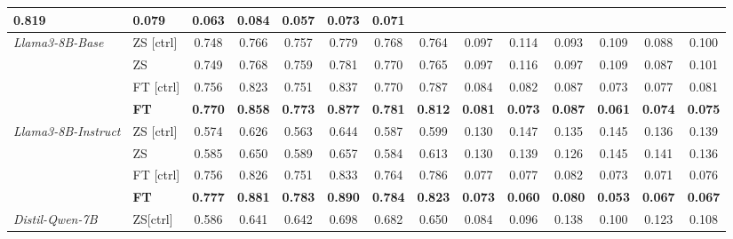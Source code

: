 \begin{table*}[!]
{\begin{tabular}{l|l|ccccc|c|ccccc|c}
\cellcolor{customgray}\textbf{0.819} & 
\cellcolor{customgray}\textbf{0.079} & 
\cellcolor{customgray}\textbf{0.063} & 
\cellcolor{customgray}\textbf{0.084} & 
\cellcolor{customgray}\textbf{0.057} & 
\cellcolor{customgray}\textbf{0.073} & 
\cellcolor{customgray}\textbf{0.071} \\ \midrule
\multirow{4}{*}{\textit{Llama3-8B-Base}} & ZS [ctrl] & 0.748 & 0.766 & 0.757 & 0.779 & 0.768 & 0.764 & 0.097 & 0.114 & 0.093 & 0.109 & 0.088  & 0.100 \\
& ZS & 0.749 & 0.768 & 0.759 & 0.781 & 0.770 & 0.765 & 0.097 & 0.116 & 0.097 & 0.109 & 0.087  & 0.101 \\
& FT [ctrl] & 0.756 & 0.823 & 0.751 & 0.837 & 0.770 & 0.787 & 0.084 & 0.082 & 0.087 & 0.073 & 0.077 & 0.081 \\
& \cellcolor{customgray}\textbf{FT} & 
\cellcolor{customgray}\textbf{0.770} & 
\cellcolor{customgray}\textbf{0.858} & 
\cellcolor{customgray}\textbf{0.773} & 
\cellcolor{customgray}\textbf{0.877} & 
\cellcolor{customgray}\textbf{0.781} & 
\cellcolor{customgray}\textbf{0.812} & 
\cellcolor{customgray}\textbf{0.081} & 
\cellcolor{customgray}\textbf{0.073} & 
\cellcolor{customgray}\textbf{0.087} & 
\cellcolor{customgray}\textbf{0.061} & 
\cellcolor{customgray}\textbf{0.074} & 
\cellcolor{customgray}\textbf{0.075} \\
\midrule
\multirow{4}{*}{\textit{Llama3-8B-Instruct}} & ZS [ctrl] & 0.574 & 0.626 & 0.563 & 0.644 & 0.587 & 0.599 & 0.130 & 0.147 & 0.135 & 0.145 & 0.136  & 0.139 \\
& ZS & 0.585 & 0.650 & 0.589 & 0.657 & 0.584 & 0.613 & 0.130 & 0.139 & 0.126 & 0.145 & 0.141  & 0.136 \\
& FT [ctrl] & 0.756 & 0.826 & 0.751 & 0.833 & 0.764 & 0.786 & 0.077 & 0.077 & 0.082 & 0.073 & 0.071 & 0.076 \\
& \cellcolor{customgray}\textbf{FT} & \cellcolor{customgray}\textbf{0.777} & \cellcolor{customgray}\textbf{0.881} & \cellcolor{customgray}\textbf{0.783} & \cellcolor{customgray}\textbf{0.890} & \cellcolor{customgray}\textbf{0.784} & \cellcolor{customgray}\textbf{0.823} & \cellcolor{customgray}\textbf{0.073}  & \cellcolor{customgray}\textbf{0.060} & \cellcolor{customgray}\textbf{0.080} & \cellcolor{customgray}\textbf{0.053} & \cellcolor{customgray}\textbf{0.067}  & \cellcolor{customgray}\textbf{0.067} \\   
\midrule
\multirow{4}{*}{\textit{Distil-Qwen-7B}} & ZS[ctrl] & 0.586 & 0.641 & 0.642 & 0.698 & 0.682 & 0.650 & 0.084 & 0.096 & 0.138 & 0.100 & 0.123 & 0.108 \\

\end{tabular}}
\end{table*}

